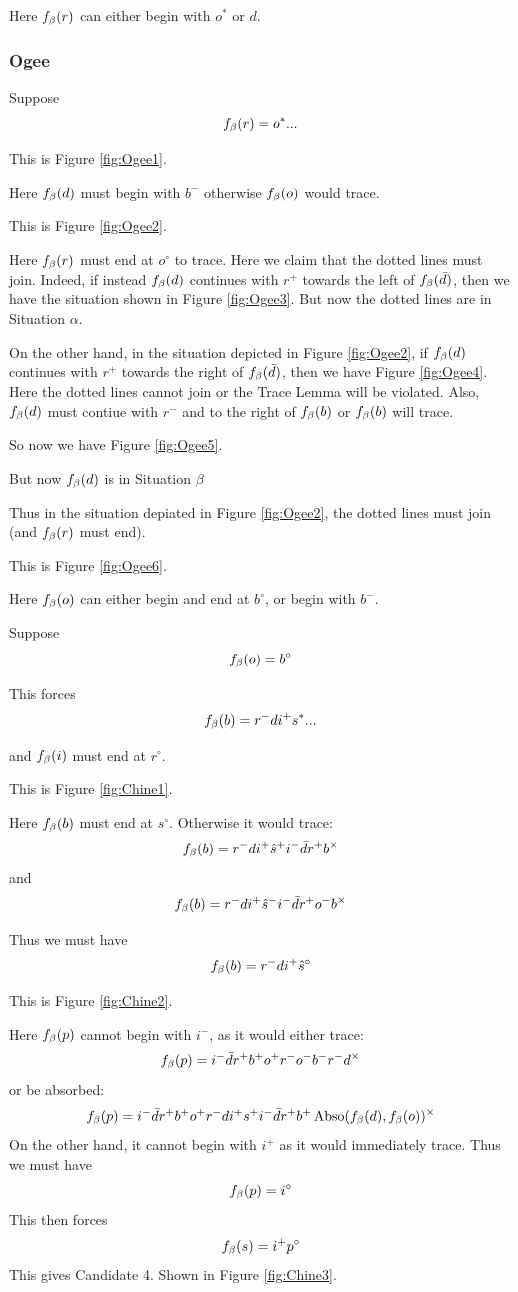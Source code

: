 Here $f_\beta(r)$ can either begin with $o^*$ or $d$.

\subsubsection{Ogee}\label{Ogee}
Suppose 
\[
f_\beta(r) = o^*...
\]

This is Figure \ref{fig:Ogee1}.

Here $f_\beta(d)$ must begin with $b^-$ otherwise $f_\beta(o)$ would trace.

This is Figure \ref{fig:Ogee2}.

Here $f_\beta(r)$ must end at $o^\circ$ to trace. Here we claim that the dotted lines must join. Indeed, if instead $f_\beta(d)$ continues with $r^+$ towards the left of $f_\beta(\bar{d})$, then we have the situation shown in Figure \ref{fig:Ogee3}. But now the dotted lines are in Situation $\alpha$.

On the other hand, in the situation depicted in Figure \ref{fig:Ogee2}, if $f_\beta(d)$ continues with $r^+$ towards the right of $f_\beta(\bar{d})$, then we have Figure \ref{fig:Ogee4}. Here the dotted lines cannot join or the Trace Lemma will be violated. Also, $f_\beta(d)$ must contiue with $r^-$ and to the right of $f_\beta(b)$ or $f_\beta(b)$ will trace.

So now we have Figure \ref{fig:Ogee5}.

But now $f_\beta(d)$ is in Situation $\beta$


Thus in the situation depiated in Figure \ref{fig:Ogee2}, the dotted lines must join (and $f_\beta(r)$ must end). 

This is Figure \ref{fig:Ogee6}.

Here $f_\beta(o)$ can either begin and end at $b^\circ$, or begin with $b^-$.


\label{Chine}
Suppose
\[
f_\beta(o) = b^\circ
\]

This forces
\[
f_\beta(b) = r^- d i^+ s^*...
\]

and $f_\beta(i)$ must end at $r^\circ$.

This is Figure \ref{fig:Chine1}.

Here $f_\beta(b)$ must end at $s^\circ$. Otherwise it would trace:
\[
f_\beta(b) = r^- d i^+ \hat{s}^+ i^- \bar{d} r^+ b^\times
\]
and
\[
f_\beta(b) = r^- d i^+ \hat{s}^- i^- \bar{d} r^+ o^- b^\times
\]

Thus we must have
\[
f_\beta(b) = r^- d i^+ \hat{s}^\circ
\]

This is Figure \ref{fig:Chine2}.

Here $f_\beta(p)$ cannot begin with $i^-$, as it would either trace:
\[
f_\beta(p) = i^- \bar{d} r^+ b^+ o^+ r^- o^- b^- r^- d ^\times
\]
or be absorbed:
\[
f_\beta(p) = i^- \bar{d} r^+ b^+ o^+ r^- d i^+ s^+ i^- \bar{d} r^+ b^+ \operatorname{Abso}(f_\beta(d), f_\beta(o))^\times
\]
On the other hand, it cannot begin with $i^+$ as it would immediately trace. Thus we must have
\[
f_\beta(p) = i^\circ
\]
This then forces 
\[
f_\beta(s) = i^+ p^\circ
\]
This gives Candidate 4. Shown in Figure \ref{fig:Chine3}.

